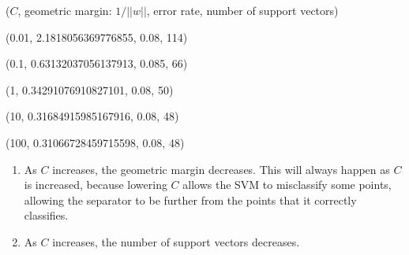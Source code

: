 \documentclass{paper}
\begin{document}
\begin{enumerate}
            ($C$, geometric margin: $1/||w||$, error rate, number of support vectors)
            
            (0.01, 2.1818056369776855, 0.08, 114)
            
            (0.1, 0.63132037056137913, 0.085, 66)
            
            (1, 0.34291076910827101, 0.08, 50)
            
            (10, 0.31684915985167916, 0.08, 48)
            
            (100, 0.31066728459715598, 0.08, 48)

    \begin{enumerate}

        \item

            As $C$ increases, the geometric margin decreases. This will always happen as $C$ is increased, because lowering $C$ allows the SVM to misclassify some points, allowing the separator to be further from the points that it correctly classifies. 

        \item

            As $C$ increases, the number of support vectors decreases.
    \end{enumerate}

\end{enumerate}
\end{document}

